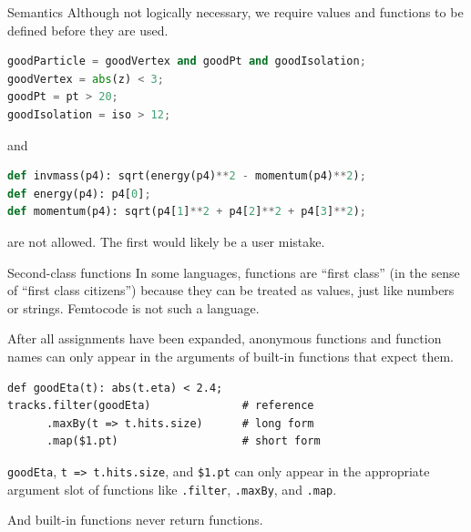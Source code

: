 \documentclass{beamer}
\begin{document}
\begin{frame}[fragile]{Semantics}
\vspace{0.5 cm}
Although not logically necessary, we require values and functions to be defined before they are used.

\begin{center}
\begin{minipage}{0.9\linewidth}
\small
\begin{lstlisting}[language=python]
goodParticle = goodVertex and goodPt and goodIsolation;
goodVertex = abs(z) < 3;
goodPt = pt > 20;
goodIsolation = iso > 12;
\end{lstlisting}
\hspace{-0.6 cm} and
\begin{lstlisting}[language=python]
def invmass(p4): sqrt(energy(p4)**2 - momentum(p4)**2);
def energy(p4): p4[0];
def momentum(p4): sqrt(p4[1]**2 + p4[2]**2 + p4[3]**2);
\end{lstlisting}
\end{minipage}
\end{center}

are not allowed. The first would likely be a user mistake.
\end{frame}

\begin{frame}[fragile]{Second-class functions}
\vspace{0.5 cm}
In some languages, functions are ``first class'' (in the sense of ``first class citizens'') because they can be treated as values, just like numbers or strings. Femtocode is not such a language.

\vspace{0.5 cm}
After all assignments have been expanded, anonymous functions and function names can only appear in the arguments of built-in functions that expect them.

\begin{center}
\begin{minipage}{0.9\linewidth}
\small
\begin{verbatim}
def goodEta(t): abs(t.eta) < 2.4;
tracks.filter(goodEta)              # reference
      .maxBy(t => t.hits.size)      # long form
      .map($1.pt)                   # short form
\end{verbatim}
\end{minipage}
\end{center}

{\tt goodEta}, {\tt t => t.hits.size}, and {\tt \$1.pt} can only appear in the appropriate argument slot of functions like {\tt .filter}, {\tt .maxBy}, and {\tt .map}.

\vspace{0.5 cm}
And built-in functions never return functions.
\end{frame}
\end{document}
